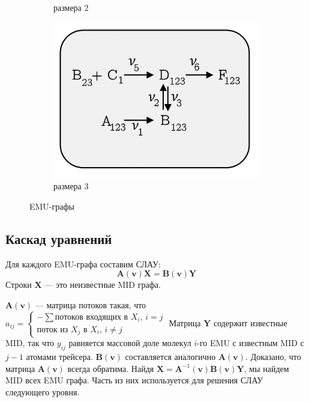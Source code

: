 \documentclass[14pt, a4paper]{extreport}
\begin{document}
\begin{figure}[b]
\begin{subfigure}{.3\linewidth}
		\caption{размера 2}
		\label {emu_graph_2}
	\end{subfigure}
	\begin{subfigure}{.3\linewidth}
		\includegraphics[width=1.2\linewidth]{EMU_graph_3.png}
		\caption{размера 3}
		\label {emu_graph_3}
	\end{subfigure}
	\caption{EMU-графы}
	\label{emu_graph}
\end{figure}

\clearpage

\subsection{Каскад уравнений}
Для каждого EMU-графа составим СЛАУ:
$$\mathbf{A}(\mathbf{v}) \mathbf{X} = \mathbf{B}(\mathbf{v}) \mathbf{Y}$$
Строки $\mathbf{X}$ --- это неизвестные MID графа.

\noindent $\mathbf{A}(\mathbf{v})$ --- матрица потоков такая, что 
$a_{ij} = 
\begin{cases} 
	\text{$-\sum$потоков входящих в $X_i$, $i=j$}\\
	\text{поток из $X_j$ в $X_i$, $i\neq{}j$}
	\end{cases}
	$
Матрица $\mathbf{Y}$ содержит известные MID, так что $y_{ij}$ равняется массовой доле молекул $i$-го EMU с известным MID с $j - 1$ атомами трейсера. $\mathbf{B}(\mathbf{v})$ составляется аналогично $\mathbf{A}(\mathbf{v})$. Доказано, что матрица $\mathbf{A}(\mathbf{v})$ всегда обратима\cite{anderson_1983}.
Найдя $\mathbf{X} = \mathbf{A}^{-1}(\mathbf{v})\mathbf{B}(\mathbf{v})\mathbf{Y}$, мы найдем MID всех EMU графа. Часть из них используется для решения СЛАУ следующего уровня.
\end{document}
